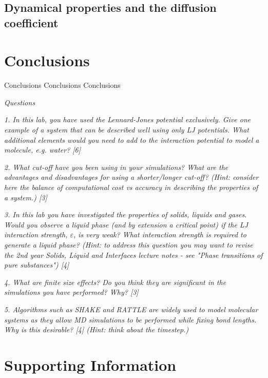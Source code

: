 \documentclass[a4paper,10pt,twocolumn]{article}
\begin{document}
\subsection{Dynamical properties and the diffusion coefficient}
\section{Conclusions} %
Conclusions Conclusions Conclusions

\textit{Questions}

\textit{1. In this lab, you have used the Lennard-Jones potential exclusively. Give one example of a system that can be described well using only LJ potentials. What additional elements would you need to add to the interaction potential to model a molecule, e.g. water? [6]}

\textit{2. What cut-off have you been using in your simulations? What are the advantages and disadvantages for using a shorter/longer cut-off? (Hint: consider here the balance of computational cost vs accuracy in describing the properties of a system.) [3]}

\textit{3. In this lab you have investigated the properties of solids, liquids and gases. Would you observe a liquid phase (and by extension a critical point) if the LJ interaction strength, $\varepsilon$, is
very weak? What interaction strength is required to generate a liquid phase? (Hint: to address this question you may want to revise the 2nd year Solids, Liquid and Interfaces lecture notes - see "Phase transitions of pure substances") [4]}

\textit{4. What are finite size effects? Do you think they are significant in the simulations you have performed? Why? [3]}

\textit{5. Algorithms such as SHAKE and RATTLE are widely used to model molecular systems as they allow MD simulations to be performed while fixing bond lengths. Why is this desirable? [4] (Hint: think about the timestep.)}

    
{\small
\setlength{\bibsep}{0pt}


}

\section*{Supporting Information} 
\setcounter{figure}{0}
\renewcommand{\thefigure}{S\arabic{figure}}
\setcounter{table}{0}
\renewcommand{\thetable}{S\arabic{table}}
\end{document}

